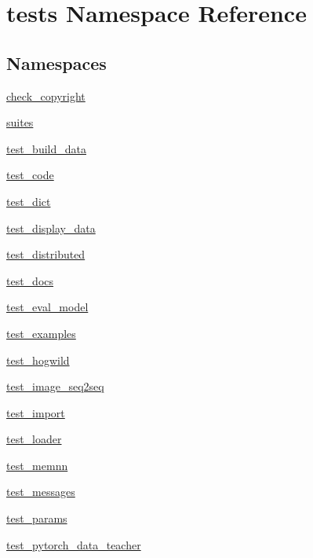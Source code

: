 \hypertarget{namespacetests}{}\section{tests Namespace Reference}
\label{namespacetests}
\subsection*{Namespaces}
\begin{DoxyCompactItemize}
\item 
 \hyperlink{namespacetests_1_1check__copyright}{check\+\_\+copyright}
\item 
 \hyperlink{namespacetests_1_1suites}{suites}
\item 
 \hyperlink{namespacetests_1_1test__build__data}{test\+\_\+build\+\_\+data}
\item 
 \hyperlink{namespacetests_1_1test__code}{test\+\_\+code}
\item 
 \hyperlink{namespacetests_1_1test__dict}{test\+\_\+dict}
\item 
 \hyperlink{namespacetests_1_1test__display__data}{test\+\_\+display\+\_\+data}
\item 
 \hyperlink{namespacetests_1_1test__distributed}{test\+\_\+distributed}
\item 
 \hyperlink{namespacetests_1_1test__docs}{test\+\_\+docs}
\item 
 \hyperlink{namespacetests_1_1test__eval__model}{test\+\_\+eval\+\_\+model}
\item 
 \hyperlink{namespacetests_1_1test__examples}{test\+\_\+examples}
\item 
 \hyperlink{namespacetests_1_1test__hogwild}{test\+\_\+hogwild}
\item 
 \hyperlink{namespacetests_1_1test__image__seq2seq}{test\+\_\+image\+\_\+seq2seq}
\item 
 \hyperlink{namespacetests_1_1test__import}{test\+\_\+import}
\item 
 \hyperlink{namespacetests_1_1test__loader}{test\+\_\+loader}
\item 
 \hyperlink{namespacetests_1_1test__memnn}{test\+\_\+memnn}
\item 
 \hyperlink{namespacetests_1_1test__messages}{test\+\_\+messages}
\item 
 \hyperlink{namespacetests_1_1test__params}{test\+\_\+params}
\item 
 \hyperlink{namespacetests_1_1test__pytorch__data__teacher}{test\+\_\+pytorch\+\_\+data\+\_\+teacher}
\item 

\end{DoxyCompactItemize}
